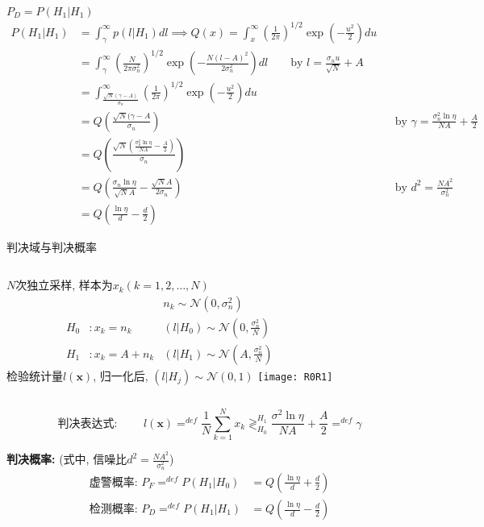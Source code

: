 \begin{frame}[shrink]{{$P_D=P(H_1|H_1)$}}
\begin{align*}
P(H_1|H_1)&=\int_{\gamma}^{\infty}p(l|H_1)dl\implies Q(x)=\int_{x}^{\infty}\left(\frac{1}{2\pi}\right)^{1/2}\exp\left(-\frac{u^2}{2}\right)du\\
&=\int_{\gamma}^{\infty}\left(\frac{N}{2\pi\sigma_n^2}\right)^{1/2}\exp\left(-\frac{N(l-A)^2}{2\sigma_n^2}\right)dl\qquad \text{by } l=\frac{\sigma_nu}{\sqrt{N}}+A\\
&=\int_{\frac{\sqrt{N}(\gamma-A)}{\sigma_n}}^{\infty}\left(\frac{1}{2\pi}\right)^{1/2}\exp\left(-\frac{u^2}{2}\right)du\\
&=Q\left(\frac{\sqrt{N}(\gamma-A}{\sigma_n}\right) &&\text{by } \gamma=\frac{\sigma_n^2\ln\eta}{NA}+\frac{A}{2}\\
&=Q\left(\frac{\sqrt{N}\left(\frac{\sigma_n^2\ln\eta}{NA}-\frac{A}{2}\right)}{\sigma_n}\right)\\
&=Q\left(\frac{\sigma_n\ln\eta}{\sqrt{N}A}-\frac{\sqrt{N}A}{2\sigma_n}\right)&& \text{by }d^2=\frac{NA^2}{\sigma_n^2}\\
&=Q\left(\frac{\ln\eta}{d}-\frac{d}{2}\right)
\end{align*}
\end{frame}

\begin{frame}[shrink]{判决域与判决概率}
\begin{columns}
$N$次独立采样, 样本为$x_k(k=1,2,\dots,N)$
\begin{align*}
&&n_k\sim\mathcal{N}(0,\sigma_n^2)\\ 
H_0 &:x_k=n_k   &(l|H_0)\sim\mathcal{N}(0,\frac{\sigma_n^2}{N})\\
H_1 &:x_k=A+n_k &(l|H_1)\sim\mathcal{N}(A,\frac{\sigma_n^2}{N})
\end{align*}
检验统计量$l(\bm{x})$, 归一化后, $(l|H_j)\sim\mathcal{N}(0,1)$
\texttt{[image: R0R1]}\\
\end{columns}
\[
\textbf{判决表达式: }\qquad l(\bm{x})\mathop{=}^{def}\frac{1}{N}\sum\limits_{k=1}^Nx_k\mathop{\gtrless}_{H_0}^{H_1}\frac{\sigma^2\ln\eta}{NA}+\frac{A}{2}\mathop{=}^{def}\gamma
\]

\textbf{判决概率:} (式中, 信噪比$d^2=\frac{NA^2}{\sigma_n^2}$)
\begin{align*}
\textbf{虚警概率: }P_F\mathop{=}^{def}P(H_1|H_0)&=Q\left(\frac{\ln\eta}{d}+\frac{d}{2}\right)\\
\textbf{检测概率: }P_D\mathop{=}^{def}P(H_1|H_1)&=Q\left(\frac{\ln\eta}{d}-\frac{d}{2}\right)
\end{align*}
\end{frame}

